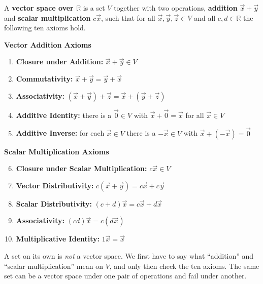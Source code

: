 \begin{definition}
A \textbf{vector space over $\mathbb{R}$} is a set $V$ together with two operations, \textbf{addition} $\vec{x} + \vec{y}$ and \textbf{scalar multiplication} $c\vec{x}$, such that for all $\vec{x}, \vec{y}, \vec{z} \in V$ and all $c, d \in \mathbb{R}$ the following ten axioms hold.

\medskip
\textbf{Vector Addition Axioms}
\begin{enumerate}[label=\textbf{V\arabic*}, leftmargin=2.6em]
    \item \textbf{Closure under Addition:} $\vec{x} + \vec{y} \in V$
    \item \textbf{Commutativity:} $\vec{x} + \vec{y} = \vec{y} + \vec{x}$
    \item \textbf{Associativity:} $(\vec{x} + \vec{y}) + \vec{z} = \vec{x} + (\vec{y} + \vec{z})$
    \item \textbf{Additive Identity:} there is a $\vec{0} \in V$ with $\vec{x} + \vec{0} = \vec{x}$ for all $\vec{x} \in V$
    \item \textbf{Additive Inverse:} for each $\vec{x} \in V$ there is a $-\vec{x} \in V$ with $\vec{x} + (-\vec{x}) = \vec{0}$
\end{enumerate}

\medskip
\textbf{Scalar Multiplication Axioms}
\begin{enumerate}[label=\textbf{V\arabic*}, leftmargin=2.6em]
    \setcounter{enumi}{5}
    \item \textbf{Closure under Scalar Multiplication:} $c\vec{x} \in V$
    \item \textbf{Vector Distributivity:} $c(\vec{x} + \vec{y}) = c\vec{x} + c\vec{y}$
    \item \textbf{Scalar Distributivity:} $(c + d)\vec{x} = c\vec{x} + d\vec{x}$
    \item \textbf{Associativity:} $(cd)\vec{x} = c(d\vec{x})$
    \item \textbf{Multiplicative Identity:} $1\vec{x} = \vec{x}$
\end{enumerate}
\end{definition}

\begin{remark}
A set on its own is \emph{not} a vector space. We first have to say what ``addition'' and ``scalar multiplication'' mean on $V$, and only then check the ten axioms. The same set can be a vector space under one pair of operations and fail under another.
\end{remark}

